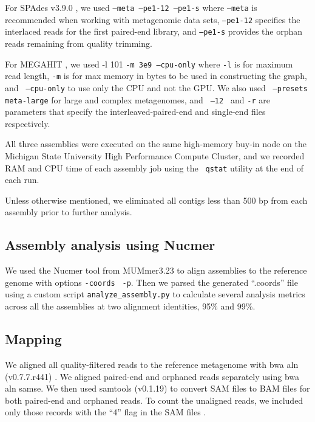 \documentclass[10pt,a4paper,twocolumn]{article}
\begin{document}
For SPAdes v3.9.0 \cite{spades}, we used { \tt {--meta --pe1-12
    --pe1-s}} where {\tt{--meta}} is recommended when working with
metagenomic data sets, {\tt{--pe1-12}} specifies the interlaced reads
for the first paired-end library, and {\tt{--pe1-s}} provides the
orphan reads remaining from quality trimming.

For MEGAHIT \cite{megahit}, we used -l 101 {\tt{-m 3e9
    --cpu-only}} where {\tt -l} is for maximum read length, {\tt -m} is
for max memory in bytes to be used in constructing the graph, and {\tt
  {--cpu-only}} to use only the CPU and not the GPU. We also used {\tt
  {--presets meta-large}} for large and complex metagenomes, and {\tt
  {--12} } and {\tt{-r}} are parameters that specify the
interleaved-paired-end and single-end files respectively.

All three assemblies were executed on the same high-memory buy-in node
on the Michigan State University High Performance Compute Cluster, and
we recorded RAM and CPU time of each assembly job using the {\tt
  qstat} utility at the end of each run.

Unless otherwise mentioned, we eliminated all contigs less than 500 bp
from each assembly prior to further analysis.

\subsection*{Assembly analysis using Nucmer}

We used the Nucmer tool from MUMmer3.23 \cite{mummer3.0} to align
assemblies to the reference genome with options {\tt \--coords} {\tt
  -p}. Then we parsed the generated ``.coords'' file using a custom
script {\tt{analyze\_assembly.py}} to calculate several analysis
metrics across all the assemblies at two alignment identities, 95\% and 99\%.

\subsection*{Mapping}

We aligned all quality-filtered reads to the reference metagenome with
bwa aln (v0.7.7.r441) \cite{bwa}. We aligned paired-end and orphaned
reads separately using bwa aln samse. We then used samtools (v0.1.19)
\cite{sam-stools} to convert SAM files to BAM files for both
paired-end and orphaned reads. To count the unaligned reads, we
included only those records with the ``4'' flag in the SAM files
\cite{sam-stools}.
 
\end{document}
